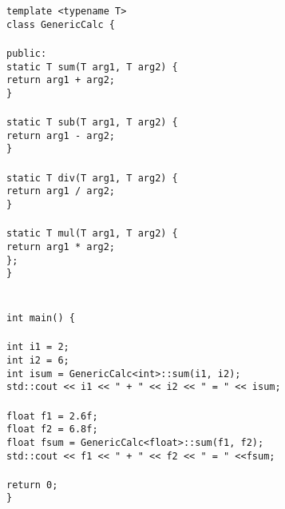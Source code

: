 \documentclass{article}
\newcommand\tab[1][1cm]{\hspace*{#1}}
\begin{document}
\texttt{template <typename T>\\class GenericCalc \{ \\ \\ \tab public: \\ \tab \tab static T sum(T arg1, T arg2) \{ \\ \tab \tab \tab return arg1 + arg2; \\ \tab \tab \} \\ \\ \tab \tab static T sub(T arg1, T arg2) \{ \\ \tab \tab \tab return arg1 - arg2; \\ \tab \tab \} \\ \\ \tab \tab static T div(T arg1, T arg2) \{ \\ \tab \tab \tab return arg1 / arg2; \\ \tab \tab \} \\ \\ \tab \tab static T mul(T arg1, T arg2) \{ \\ \tab \tab \tab return arg1 * arg2; \\ \tab \tab \}; \\ \} \\ \\ \\ int main() \{ \\ \\ \tab int i1 = 2; \\ \tab int i2 = 6; \\ \tab int isum = GenericCalc<int>::sum(i1, i2); \\ \tab std::cout << i1 << " + " << i2 << " = " << isum;\\ \\ \tab float f1 = 2.6f; \\ \tab float f2 = 6.8f; \\ \tab float fsum = GenericCalc<float>::sum(f1, f2); \\ \tab std::cout << f1 << " + " << f2 << " = " <<fsum; \\ \\ \tab return 0; \\ \} } \\ \\
\end{document}
